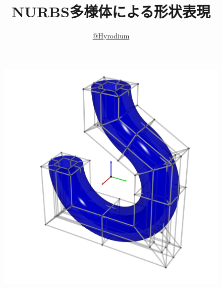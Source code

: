 \documentclass{jsarticle}
\title{NURBS多様体による形状表現}
\author{\href{https://twitter.com/hyrodium}{@Hyrodium}}
\theoremstyle{definition}%
\begin{document}
\maketitle
\vspace{2em}
\begin{figure}[htbp]
	\centering
    \includegraphics[width=160mm]{Sample21.png}
\end{figure}

\thispagestyle{empty}
\newpage

\end{document}
